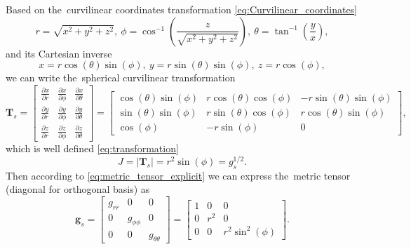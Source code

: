\documentclass[review]{elsarticle}
\newcommand{\pdv}[2]{\frac{\partial{#1}}{\partial{#2}}}
\newcommand{\matr}[1]{\mathbf{#1}}
\begin{document}
Based on the~curvilinear coordinates transformation 
\eqref{eq:Curvilinear_coordinates}
\begin{equation}
  r = \sqrt{x^2 + y^2 + z^2} ,~ 
  \phi = \cos^{-1} \left( \frac{z}{\sqrt{x^2 + y^2 + z^2}} \right),~
  \theta = \tan^{-1}\left( \frac{y}{x} \right) ,
  \label{eq:spher_curvilinear_transformation}
\end{equation}
and its Cartesian inverse
\begin{equation}
  x = r \cos(\theta)\sin(\phi) ,~ 
  y = r \sin(\theta)\sin(\phi) ,~ 
  z = r \cos(\phi),
  \label{eq:spher_Cartesian_transformation}
\end{equation}
we can write the~spherical curvilinear transformation
\begin{equation}
  \matr{T}_{s} = \begin{bmatrix}
        \pdv{x}{r} & \pdv{x}{\phi} & \pdv{x}{\theta} \\
        \pdv{y}{r} & \pdv{y}{\phi} & \pdv{y}{\theta} \\
        \pdv{z}{r} & \pdv{z}{\phi} & \pdv{z}{\theta} 
	  \end{bmatrix}
  = \begin{bmatrix}
  \cos(\theta)\sin(\phi) & r\cos(\theta)\cos(\phi) & -r\sin(\theta)\sin(\phi) \\
  \sin(\theta)\sin(\phi) & r\sin(\theta)\cos(\phi) & r\cos(\theta)\sin(\phi) \\
  \cos(\phi) & -r\sin(\phi) & 0  
  \end{bmatrix} ,
  \label{eq:spher_transformation}
\end{equation}
which is well defined \eqref{eq:transformation}
\begin{equation}
  J = |\matr{T}_{s}| = r^2\sin(\phi) = g_s^{1/2}.
  \label{eq:spher_J}
\end{equation}
Then according to \eqref{eq:metric_tensor_explicit} we can express the~metric
tensor (diagonal for orthogonal basis) as
\begin{equation}
  \matr{g}_s = \begin{bmatrix}
                 g_{rr} & 0 & 0 \\
			     0 & g_{\phi\phi} & 0 \\
			     0 & 0 & g_{\theta\theta}
			   \end{bmatrix}
             = \begin{bmatrix}
                 1 & 0 & 0 \\
			     0 & r^2 & 0 \\
			     0 & 0 & r^2\sin^2(\phi)
			   \end{bmatrix} .
  \label{eq:spher_metric_tensor}		   
\end{equation}
\end{document}
